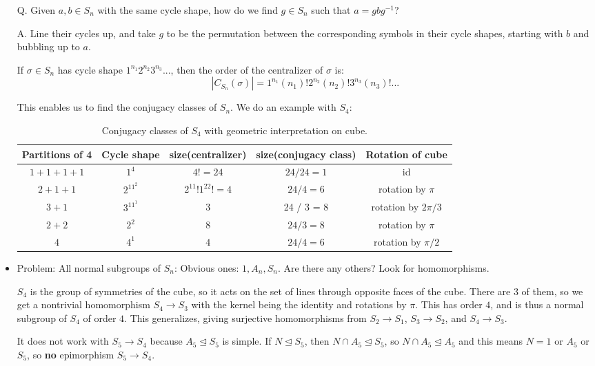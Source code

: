 \documentclass[11pt, oneside]{amsart}   	%
\theoremstyle{definition}
\begin{document}
\begin{itemize}
	Q. Given $a, b\in S_n$ with the same cycle shape, how do we find $g\in S_n$ such that $a = gbg^{-1}$?
	
	A. Line their cycles up, and take $g$ to be the permutation between the corresponding symbols in their cycle shapes, starting with $b$ and 
	bubbling up to $a$.
	
	If $\sigma\in S_n$ has cycle shape $1^{n_1}2^{n_2}3^{n_3}...$, then the order of the centralizer of $\sigma$ is:
	$$
		|C_{S_n}(\sigma)| = 1^{n_1}(n_1)!2^{n_2}(n_2)!3^{n_3}(n_3)!...
	$$
	
	This enables us to find the conjugacy classes of $S_n$. We do an example with $S_4$:
	
	\begin{table}[H]
	\centering
		\begin{tabular}{| c | c | c | c | c |}
			\hline
			Partitions of 4 & Cycle shape & size(centralizer) & size(conjugacy class) & Rotation of cube \\
			\hline
			$1 + 1 + 1 + 1$ & $1^4$ & $4! = 24$ & $24 / 24 = 1$ & id \\
			\hline
			$2 + 1 + 1$ & $2^11^2$ & $2^11!1^22! = 4$ & $24 / 4 = 6$ & rotation by $\pi$ \\
			\hline
			$3 + 1$ & $3^11^1$ & $3$ & 24 / 3 = 8 & rotation by $2\pi / 3$ \\
			\hline
			$2 + 2$ & $2^2$ & $8$ & $24 / 3 = 8$ & rotation by $\pi$ \\
			\hline
			$4$ & $4^1$ & $4$ & $24 / 4 = 6$ & rotation by $\pi / 2$ \\
			\hline
		\end{tabular}
	\caption{Conjugacy classes of $S_4$ with geometric interpretation on cube.}
	\end{table}
	
	\item Problem: All normal subgroups of $S_n$: Obvious ones: $1, A_n, S_n$. Are there any others? Look for homomorphisms.
	
	$S_4$ is the group of symmetries of the cube, so it acts on the set of lines through opposite faces of the cube. There are $3$ of them, so we get 
	a nontrivial homomorphism $S_4\rightarrow S_3$ with the kernel being the identity and rotations by $\pi$. This has order $4$, and is thus a 
	normal subgroup of $S_4$ of order $4$. This generalizes, giving surjective homomorphisms from $S_2\rightarrow S_1$, $S_3\rightarrow S_2$, 
	and $S_4\rightarrow S_3$. 
	
	It does not work with $S_5\rightarrow S_4$ because $A_5\trianglelefteq S_5$ is simple. If $N\trianglelefteq S_5$, then $N\cap A_5\trianglelefteq 
	S_5$, so $N\cap A_5\trianglelefteq A_5$ and this means $N = 1 $ or $A_5$ or $S_5$, so \textbf{no} epimorphism $S_5\rightarrow S_4$.
	

\end{itemize}
\end{document}
